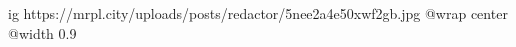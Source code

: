  
 
 
 
 

\ifcmt
  ig https://mrpl.city/uploads/posts/redactor/5nee2a4e50xwf2gb.jpg
  @wrap center
  @width 0.9
\fi
